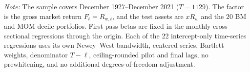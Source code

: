 \begin{table}[H]
\begin{minipage}{0.99\textwidth}
    \par\smallskip
    {\footnotesize\raggedright \textit{Note:} The sample covers December 1927--December 2021 ($T=1129$). The factor is the gross market return $F_t=R_{w,t}$, and the test assets are $xR_w$ and the 20 BM and MOM decile portfolios. First-pass betas are fixed in the monthly cross-sectional regressions through the origin. Each of the 22 intercept-only time-series regressions uses its own Newey--West bandwidth, centered series, Bartlett weights, denominator $T-\ell$, ceiling-rounded pilot and final lags, no prewhitening, and no additional degrees-of-freedom adjustment.\par}
  \end{minipage}
\end{table}
